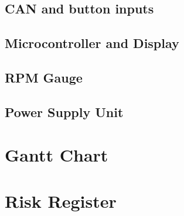 \documentclass[a4paper,12pt]{article}
\begin{document}
\subsection{CAN and button inputs}
\label{app:can}


\subsection{Microcontroller and Display}
\label{app:microcontroller}


\subsection{RPM Gauge}
\label{app:leds}


\subsection{Power Supply Unit}
\label{app:psu}


\section{Gantt Chart}
\label{app:gantt_chart}
\vspace{-2.5cm}


\section{Risk Register}
\label{app:risk_register}



\newpage


\end{document}
